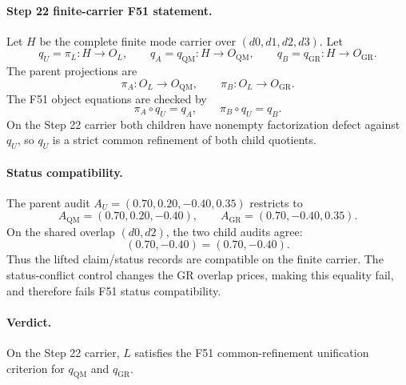 \paragraph{Step 22 finite-carrier F51 statement.}
Let \(H\) be the complete finite mode carrier over
\((d0,d1,d2,d3)\).  Let
\[
q_U=\pi_L:H\to O_L,\qquad
q_A=q_{\mathrm{QM}}:H\to O_{\mathrm{QM}},\qquad
q_B=q_{\mathrm{GR}}:H\to O_{\mathrm{GR}}.
\]
The parent projections are
\[
\pi_A:O_L\to O_{\mathrm{QM}},\qquad
\pi_B:O_L\to O_{\mathrm{GR}}.
\]
The F51 object equations are checked by
\[
\pi_A\circ q_U=q_A,\qquad \pi_B\circ q_U=q_B.
\]
On the Step 22 carrier both children have nonempty factorization
defect against \(q_U\), so \(q_U\) is a strict common refinement of
both child quotients.

\paragraph{Status compatibility.}
The parent audit \(A_U=(0.70,0.20,-0.40,0.35)\) restricts to
\[
A_{\mathrm{QM}}=(0.70,0.20,-0.40),\qquad
A_{\mathrm{GR}}=(0.70,-0.40,0.35).
\]
On the shared overlap \((d0,d2)\), the two child audits agree:
\[
(0.70,-0.40)=(0.70,-0.40).
\]
Thus the lifted claim/status records are compatible on the finite
carrier.  The status-conflict control changes the GR overlap prices,
making this equality fail, and therefore fails F51 status
compatibility.

\paragraph{Verdict.}
On the Step 22 carrier, \(L\) satisfies the F51 common-refinement
unification criterion for \(q_{\mathrm{QM}}\) and \(q_{\mathrm{GR}}\).
